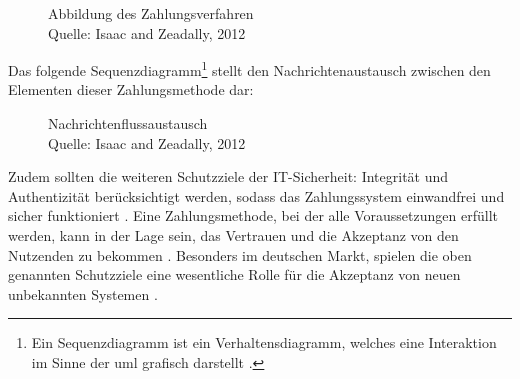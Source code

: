 \begin{figure}[H]
    \caption{Abbildung des Zahlungsverfahren\\ Quelle: Isaac and Zeadally, 2012}
    \label{fig:refart:JTAS}
\end{figure}

Das folgende Sequenzdiagramm\footnote{Ein Sequenzdiagramm ist ein Verhaltensdiagramm, welches eine Interaktion
im Sinne der \acrfull{uml} grafisch darstellt \cite{refbook:IASE}.} stellt den 
Nachrichtenaustausch zwischen den Elementen dieser Zahlungsmethode dar:

\vfill
\begin{figure}[H]
    \caption{Nachrichtenflussaustausch \\ Quelle: Isaac and Zeadally, 2012}
    \label{fig:refart:JTAS_2}
\end{figure}

Zudem sollten die weiteren Schutzziele der IT-Sicherheit: Integrität und Authentizität berücksichtigt werden, 
sodass das Zahlungssystem einwandfrei und sicher funktioniert \cite{refip:GMPS}. Eine Zahlungsmethode, bei der 
alle Voraussetzungen erfüllt werden, kann in der Lage sein, das Vertrauen und die Akzeptanz von den Nutzenden 
zu bekommen \cite{refart:HARE}. Besonders im deutschen Markt, spielen die oben genannten Schutzziele eine 
wesentliche Rolle für die Akzeptanz von neuen unbekannten Systemen \cite{refip:DKAM}.

